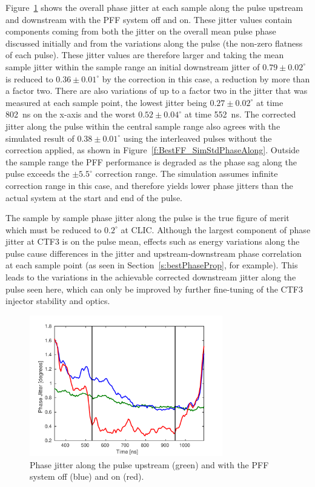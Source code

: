 Figure~\ref{f:BestFF_StdPhaseAlong} shows the overall phase jitter at each sample along the pulse upstream and downstream with the PFF system off and on. These jitter values contain components coming from both the jitter on the overall mean pulse phase discussed initially and from the variations along the pulse (the non-zero flatness of each pulse). These jitter values are therefore larger and taking the mean sample jitter within the sample range an initial downstream jitter of \(0.79\pm0.02^\circ\) is reduced to \(0.36\pm0.01^\circ\) by the correction in this case, a reduction by more than a factor two. There are also variations of up to a factor two in the jitter that was measured at each sample point, the lowest jitter being \(0.27\pm0.02^\circ\) at time 802~ns on the x-axis and the worst \(0.52\pm0.04^\circ\) at time 552~ns. The corrected jitter along the pulse within the central sample range also agrees with the simulated result of \(0.38\pm0.01^\circ\) using the interleaved pulses without the correction applied, as shown in Figure~\ref{f:BestFF_SimStdPhaseAlong}. Outside the sample range the PFF performance is degraded as the phase sag along the pulse exceeds the \(\pm5.5^\circ\) correction range. The simulation assumes infinite correction range in this case, and therefore yields lower phase jitters than the actual system at the start and end of the pulse.

The sample by sample phase jitter along the pulse is the true figure of merit which must be reduced to \(0.2^\circ\) at CLIC. Although the largest component of phase jitter at CTF3 is on the pulse mean, effects such as energy variations along the pulse cause differences in the jitter and upstream-downstream phase correlation at each sample point (as seen in Section~\ref{s:bestPhaseProp}, for example). This leads to the variations in the achievable corrected downstream jitter along the pulse seen here, which can only be improved by further fine-tuning of the CTF3 injector stability and optics.

\begin{figure}
  \centering
  \includegraphics[width=0.75\textwidth]{Figures/feedforward/BestFF_StdPhaseAlong}
  \caption{Phase jitter along the pulse upstream (green) and with the PFF system off (blue) and on (red).}
  \label{f:BestFF_StdPhaseAlong}
\end{figure}

